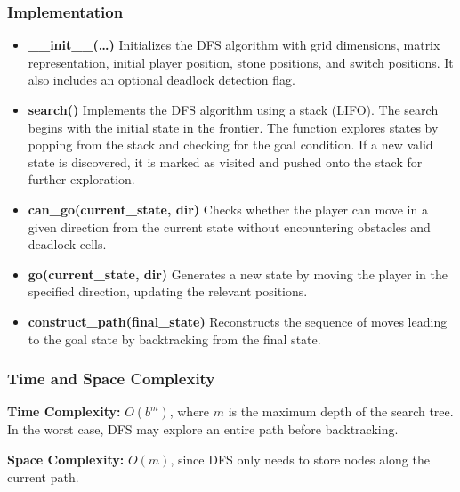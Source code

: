 \subsubsection{Implementation}
\begin{itemize}
	\item \textbf{\_\_init\_\_(\ldots)}
	      Initializes the DFS algorithm with grid dimensions, matrix representation, initial player position, stone positions, and switch positions. It also includes an optional deadlock detection flag.

	\item \textbf{search()}
	      Implements the DFS algorithm using a stack (LIFO). The search begins with the initial state in the frontier. The function explores states by popping from the stack and checking for the goal condition. If a new valid state is discovered, it is marked as visited and pushed onto the stack for further exploration.

	\item \textbf{can\_go(current\_state, dir)}
	      Checks whether the player can move in a given direction from the current state without encountering obstacles and deadlock cells.

	\item \textbf{go(current\_state, dir)}
	      Generates a new state by moving the player in the specified direction, updating the relevant positions.

	\item \textbf{construct\_path(final\_state)}
	      Reconstructs the sequence of moves leading to the goal state by backtracking from the final state.

\end{itemize}


\subsubsection{Time and Space Complexity}
\textbf{Time Complexity:} \( O(b^m) \), where \( m \) is the maximum depth of the search tree. In the worst case, DFS may explore an entire path before backtracking.

\textbf{Space Complexity:} \( O(m) \), since DFS only needs to store nodes along the current path.
